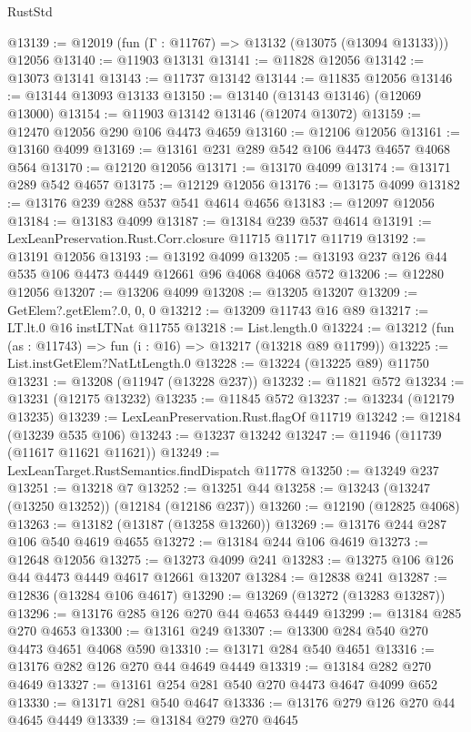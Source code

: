 \begin{lexlean}{RustStd}
\begin{coremodule}
@13139 := @12019 (fun (Γ : @11767) => @13132 (@13075 (@13094 @13133))) @12056
@13140 := @11903 @13131
@13141 := @11828 @12056
@13142 := @13073 @13141
@13143 := @11737 @13142
@13144 := @11835 @12056
@13146 := @13144 @13093 @13133
@13150 := @13140 (@13143 @13146) (@12069 @13000)
@13154 := @11903 @13142 @13146 (@12074 @13072)
@13159 := @12470 @12056 @290 @106 @4473 @4659
@13160 := @12106 @12056
@13161 := @13160 @4099
@13169 := @13161 @231 @289 @542 @106 @4473 @4657 @4068 @564
@13170 := @12120 @12056
@13171 := @13170 @4099
@13174 := @13171 @289 @542 @4657
@13175 := @12129 @12056
@13176 := @13175 @4099
@13182 := @13176 @239 @288 @537 @541 @4614 @4656
@13183 := @12097 @12056
@13184 := @13183 @4099
@13187 := @13184 @239 @537 @4614
@13191 := LexLeanPreservation.Rust.Corr.closure @11715 @11717 @11719
@13192 := @13191 @12056
@13193 := @13192 @4099
@13205 := @13193 @237 @126 @44 @535 @106 @4473 @4449 @12661 @96 @4068 @4068 @572
@13206 := @12280 @12056
@13207 := @13206 @4099
@13208 := @13205 @13207
@13209 := GetElem?.getElem?.{0, 0, 0}
@13212 := @13209 @11743 @16 @89
@13217 := LT.lt.{0} @16 instLTNat @11755
@13218 := List.length.{0}
@13224 := @13212 (fun (as : @11743) => fun (i : @16) => @13217 (@13218 @89 @11799))
@13225 := List.instGetElem?NatLtLength.{0}
@13228 := @13224 (@13225 @89) @11750
@13231 := @13208 (@11947 (@13228 @237))
@13232 := @11821 @572
@13234 := @13231 (@12175 @13232)
@13235 := @11845 @572
@13237 := @13234 (@12179 @13235)
@13239 := LexLeanPreservation.Rust.flagOf @11719
@13242 := @12184 (@13239 @535 @106)
@13243 := @13237 @13242
@13247 := @11946 (@11739 (@11617 @11621 @11621))
@13249 := LexLeanTarget.RustSemantics.findDispatch @11778
@13250 := @13249 @237
@13251 := @13218 @7
@13252 := @13251 @44
@13258 := @13243 (@13247 (@13250 @13252)) (@12184 (@12186 @237))
@13260 := @12190 (@12825 @4068)
@13263 := @13182 (@13187 (@13258 @13260))
@13269 := @13176 @244 @287 @106 @540 @4619 @4655
@13272 := @13184 @244 @106 @4619
@13273 := @12648 @12056
@13275 := @13273 @4099 @241
@13283 := @13275 @106 @126 @44 @4473 @4449 @4617 @12661 @13207
@13284 := @12838 @241
@13287 := @12836 (@13284 @106 @4617)
@13290 := @13269 (@13272 (@13283 @13287))
@13296 := @13176 @285 @126 @270 @44 @4653 @4449
@13299 := @13184 @285 @270 @4653
@13300 := @13161 @249
@13307 := @13300 @284 @540 @270 @4473 @4651 @4068 @590
@13310 := @13171 @284 @540 @4651
@13316 := @13176 @282 @126 @270 @44 @4649 @4449
@13319 := @13184 @282 @270 @4649
@13327 := @13161 @254 @281 @540 @270 @4473 @4647 @4099 @652
@13330 := @13171 @281 @540 @4647
@13336 := @13176 @279 @126 @270 @44 @4645 @4449
@13339 := @13184 @279 @270 @4645

\end{coremodule}
\end{lexlean}
